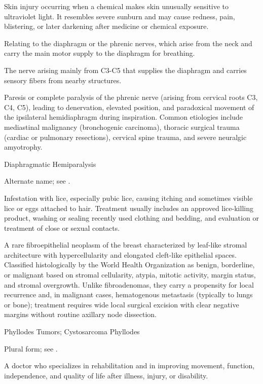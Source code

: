  Skin injury occurring when a chemical makes skin unusually sensitive to ultraviolet light. It resembles severe sunburn and may cause redness, pain, blistering, or later darkening after medicine or chemical exposure.

 Relating to the diaphragm or the phrenic nerves, which arise from the neck and carry the main motor supply to the diaphragm for breathing.

 The nerve arising mainly from C3-C5 that supplies the diaphragm and carries sensory fibers from nearby structures.

 Paresis or complete paralysis of the phrenic nerve (arising from cervical roots C3, C4, C5), leading to denervation, elevated position, and paradoxical movement of the ipsilateral hemidiaphragm during inspiration. Common etiologies include mediastinal malignancy (bronchogenic carcinoma), thoracic surgical trauma (cardiac or pulmonary resections), cervical spine trauma, and severe neuralgic amyotrophy.

\synonyms
Diaphragmatic Hemiparalysis

 Alternate name; see .

 Infestation with lice, especially pubic lice, causing itching and sometimes visible lice or eggs attached to hair. Treatment usually includes an approved lice-killing product, washing or sealing recently used clothing and bedding, and evaluation or treatment of close or sexual contacts.

 A rare fibroepithelial neoplasm of the breast characterized by leaf-like stromal architecture with hypercellularity and elongated cleft-like epithelial spaces. Classified histologically by the World Health Organization as benign, borderline, or malignant based on stromal cellularity, atypia, mitotic activity, margin status, and stromal overgrowth. Unlike fibroadenomas, they carry a propensity for local recurrence and, in malignant cases, hematogenous metastasis (typically to lungs or bone); treatment requires wide local surgical excision with clear negative margins without routine axillary node dissection.

\synonyms
Phyllodes Tumors; Cystosarcoma Phyllodes

 Plural form; see .

 A doctor who specializes in rehabilitation and in improving movement, function, independence, and quality of life after illness, injury, or disability.

